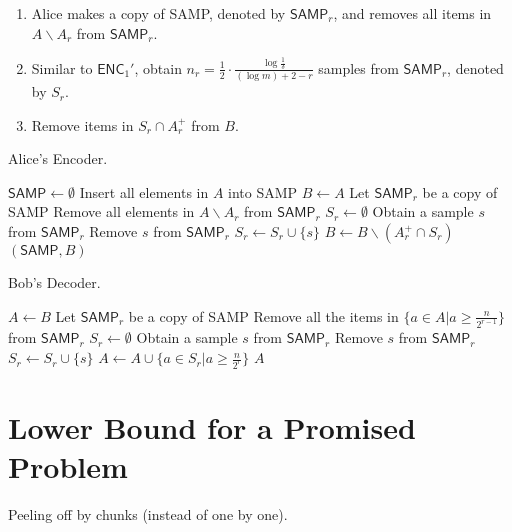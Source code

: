 \documentclass[10pt]{article}
\newcommand{\samp}{\textsf{SAMP}\xspace}
\newcommand{\enc}{\textsf{ENC}\xspace}
\newcommand{\dec}{\textsf{DEC}\xspace}
\begin{document}
\begin{enumerate}
\item Alice makes a copy of \samp, denoted by $\samp_r$, and removes all items in $A\backslash A_r$ from $\samp_r$.  
\item Similar to $\enc_1'$, obtain $n_r=\frac{1}{2}\cdot \frac{\log \frac{1}{\delta}}{(\log m)+2-r}$ samples from $\samp_r$, denoted by $S_r$. 
\item Remove items in $S_r\cap A_r^{+}$ from $B$.
\end{enumerate}

\begin{algorithm}[H]
  \caption{Alice's Encoder.}
  \begin{algorithmic}[1]
    \Procedure{$\enc_2$}{$A$}
    \State $\samp \leftarrow \emptyset$
    \State Insert all elements in $A$ into \samp
    \State $B\leftarrow A$
      \State Let $\samp_r$ be a copy of \samp
      \State Remove all elements in $A\backslash A_r$ from $\samp_r$
      \State $S_r\leftarrow \emptyset$
        \State Obtain a sample $s$ from $\samp_r$
        \State Remove $s$ from $\samp_r$
        \State $S_r\leftarrow S_r \cup \{s\}$
      \EndFor
      \State $B \leftarrow B \backslash (A_r^{+}\cap S_r)$
    \EndFor
    \State \Return $(\samp, B)$ 
    \EndProcedure
  \end{algorithmic}
\end{algorithm}

\begin{algorithm}[H]
  \caption{Bob's Decoder.}
  \begin{algorithmic}[1]
    \Procedure{$\dec_2$}{\samp, $B$}
    \State $A\leftarrow B$
      \State Let $\samp_r$ be a copy of \samp 
      \State Remove all the items in $\{a\in A|a\ge \frac{n}{2^{r-1}}\}$ from $\samp_r$
      \State $S_r\leftarrow \emptyset$
      \State Obtain a sample $s$ from $\samp_r$
      \State Remove $s$ from $\samp_r$
      \State $S_r\leftarrow S_r \cup \{s\}$
      \EndFor
      \State $A \leftarrow A \cup \{a\in S_r|a \ge \frac{n}{2^r}\}$
    \EndFor
    \State \Return $A$ 
    \EndProcedure
  \end{algorithmic}
\end{algorithm}


\section{Lower Bound for a Promised Problem}
Peeling off by chunks (instead of one by one). 
\end{document}
